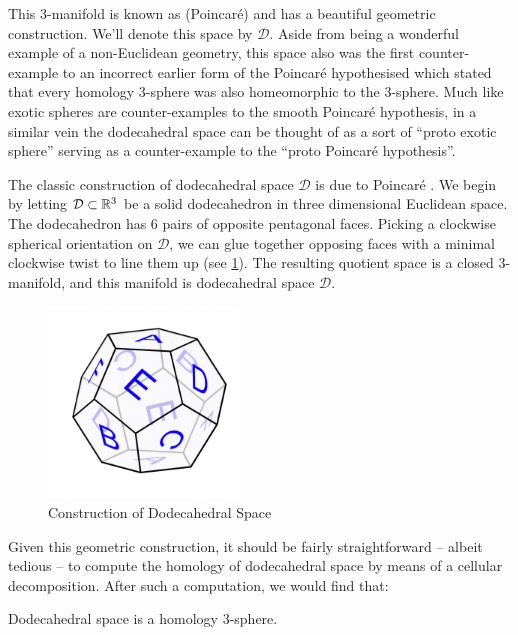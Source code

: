 
This $3$-manifold is known as (Poincar\'e)  and has a beautiful geometric construction. We'll denote this space by $\mathscr{D}$. Aside from being a wonderful example of a non-Euclidean geometry, this space also was the first counter-example to an incorrect earlier form of the Poincar\'e hypothesised which stated that every homology $3$-sphere was also homeomorphic to the $3$-sphere. Much like exotic spheres are counter-examples to the smooth Poincar\'e hypothesis, in a similar vein the dodecahedral space can be thought of as a sort of ``proto exotic sphere'' serving as a counter-example to the ``proto Poincar\'e hypothesis''.

The classic construction of dodecahedral space $\mathscr{D}$ is due to Poincar\'e . We begin by letting $\mathcal{D}\subset \mathbb{R}^3$ be a solid dodecahedron in three dimensional Euclidean space. The dodecahedron has 6 pairs of opposite pentagonal faces. Picking a clockwise spherical orientation on $\mathcal{D}$, we can glue together opposing faces with a minimal clockwise twist to line them up (see \cref{fig:dodecahedral_space_construction}). The resulting quotient space is a closed $3$-manifold, and this manifold is dodecahedral space $\mathscr{D}$.

\begin{figure}[ht]
	\centering
	\includegraphics[width=2in]{graphics/temp-diagrams/dodecahedral-space-geometric-construction.png}
	\caption{Construction of Dodecahedral Space}\label{fig:dodecahedral_space_construction}
\end{figure}

Given this geometric construction, it should be fairly straightforward -- albeit tedious -- to compute the homology of dodecahedral space by means of a cellular decomposition. After such a computation, we would find that:
\begin{proposition}
	Dodecahedral space is a homology $3$-sphere.
\end{proposition}

